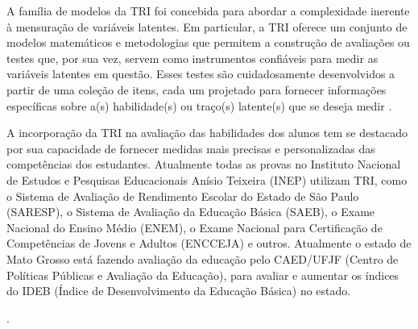 A família de modelos da TRI foi concebida para abordar a complexidade inerente à mensuração de variáveis latentes. Em particular, a TRI oferece um conjunto de modelos matemáticos e metodologias que permitem a construção de avaliações ou testes que, por sua vez, servem como instrumentos confiáveis para medir as variáveis latentes em questão. Esses testes são cuidadosamente desenvolvidos a partir de uma coleção de itens, cada um projetado para fornecer informações específicas sobre a(s) habilidade(s) ou traço(s) latente(s) que se deseja medir \cite{pasquali2018}.

A incorporação da TRI na avaliação das habilidades dos alunos tem se destacado por sua capacidade de fornecer medidas mais precisas e personalizadas das competências dos estudantes. Atualmente todas as provas no Instituto Nacional de Estudos e Pesquisas Educacionais Anísio Teixeira (INEP) utilizam TRI, como o Sistema de Avaliação de Rendimento Escolar do Estado de São Paulo (SARESP), o Sistema de Avaliação da Educação Básica (SAEB), o Exame Nacional do Ensino Médio (ENEM), o Exame Nacional para Certificação de Competências de Jovens e Adultos (ENCCEJA) e outros. Atualmente o estado de Mato Grosso está fazendo avaliação da educação pelo CAED/UFJF (Centro de Políticas Públicas e Avaliação da Educação), para avaliar e aumentar os índices do IDEB (Índice de Desenvolvimento da Educação Básica) no estado.

.



  

\begin{comment}
	Atualmente, o Enem é dividido em 5 partes, a redação e 4 áreas de conhecimento: Linguagens, Ciências Humanas, Matemática e Ciências da Natureza. Cada uma dessas áreas é considerado como uma habilidade $\theta$. O ENEM estima cada uma dessas habilidades separadamente. Considerando que cada área está medindo o mesmo $\theta$ \cite{inep2021}.
	
	
	Além disso, ao utilizar modelos estatísticos sofisticados, a TRI é capaz de estimar as habilidades latentes dos alunos de forma mais precisa, levando em consideração a dificuldade dos itens e a capacidade discriminativa de cada questão. Dessa forma, a TRI oferece uma abordagem mais justa e confiável para avaliar o progresso dos alunos, fornecendo informações valiosas que podem ser usadas para direcionar o ensino, identificar alunos que precisam de apoio adicional e melhorar o currículo escolar. Consequentemente, a TRI desempenha um papel essencial na promoção de práticas educacionais eficazes e na melhoria contínua da qualidade da educação.
	
\end{comment}


